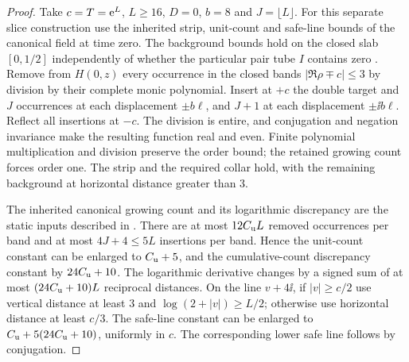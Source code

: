 \begin{proof}
Take $c=T=\mathrm e^L$, $L\ge16$, $D=0$, $b=8$ and $J=\lfloor L\rfloor$.
For this separate slice construction use the inherited strip, unit-count
and safe-line bounds of the canonical field at time zero. The background
bounds hold on the closed slab $[0,1/2]$ independently of whether the
particular pair tube $I$ contains zero \cite{BakerBase,BakerGR05}.
Remove from $H(0,z)$ every occurrence in the closed bands
$|\Re\rho\mp c|\le3$ by division by their complete monic polynomial.
Insert at $+c$ the double target and $J$ occurrences at each
displacement $\pm b\ell$, and $J+1$ at each displacement
$\pm\ii b\ell$. Reflect all insertions at $-c$. The division is
entire, and conjugation and negation invariance make the resulting
function real and even. Finite polynomial multiplication and division
preserve the order bound; the retained growing count forces order one.
The strip and the required collar hold, with the remaining background
at horizontal distance greater than $3$.

The inherited canonical growing count and its logarithmic discrepancy
are the static inputs described in \cite[Section 3]{BakerGR05}.
There are at most $12C_{\mathrm u} L$ removed occurrences per band and at most
$4J+4\le5L$ insertions per band. Hence the unit-count constant can
be enlarged to $C_{\mathrm u}+5$, and the cumulative-count discrepancy constant
by $24C_{\mathrm u}+10$. The logarithmic derivative changes by a signed sum
of at most $(24C_{\mathrm u}+10)L$ reciprocal distances. On the line $v+4\ii$,
if $|v|\ge c/2$ use vertical distance at least $3$ and
$\log(2+|v|)\ge L/2$; otherwise use horizontal distance at least
$c/3$. The safe-line constant can be enlarged to
$C_{\mathrm u}+5(24C_{\mathrm u}+10)$, uniformly in $c$.
The corresponding lower safe line follows by conjugation.


\end{proof}
